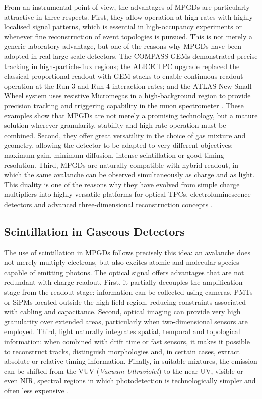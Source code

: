 \documentclass[12pt,a4paper]{article}
\begin{document}
From an instrumental point of view, the advantages of MPGDs are particularly attractive in three respects. First, they allow operation at high rates with highly localised signal patterns, which is essential in high-occupancy experiments or whenever fine reconstruction of event topologies is pursued. This is not merely a generic laboratory advantage, but one of the reasons why MPGDs have been adopted in real large-scale detectors. The COMPASS GEMs demonstrated precise tracking in high-particle-flux regions; the ALICE TPC upgrade replaced the classical proportional readout with GEM stacks to enable continuous-readout operation at the Run 3 and Run 4 interaction rates; and the ATLAS New Small Wheel system uses resistive Micromegas in a high-background region to provide precision tracking and triggering capability in the muon spectrometer \cite{ketzer2004compass,adolfsson2021alice,manthos2019atlas}. These examples show that MPGDs are not merely a promising technology, but a mature solution wherever granularity, stability and high-rate operation must be combined. Second, they offer great versatility in the choice of gas mixture and geometry, allowing the detector to be adapted to very different objectives: maximum gain, minimum diffusion, intense scintillation or good timing resolution. Third, MPGDs are naturally compatible with hybrid readout, in which the same avalanche can be observed simultaneously as charge and as light. This duality is one of the reasons why they have evolved from simple charge multipliers into highly versatile platforms for optical TPCs, electroluminescence detectors and advanced three-dimensional reconstruction concepts \cite{oliveira2012simulation,williams2024fatgems}.

\subsection{Scintillation in Gaseous Detectors}

The use of scintillation in MPGDs follows precisely this idea: an avalanche does not merely multiply electrons, but also excites atomic and molecular species capable of emitting photons. The optical signal offers advantages that are not redundant with charge readout. First, it partially decouples the amplification stage from the readout stage: information can be collected using cameras, PMTs or SiPMs located outside the high-field region, reducing constraints associated with cabling and capacitance. Second, optical imaging can provide very high granularity over extended areas, particularly when two-dimensional sensors are employed. Third, light naturally integrates spatial, temporal and topological information: when combined with drift time or fast sensors, it makes it possible to reconstruct tracks, distinguish morphologies and, in certain cases, extract absolute or relative timing information. Finally, in suitable mixtures, the emission can be shifted from the VUV (\textit{Vacuum Ultraviolet}) to the near UV, visible or even NIR, spectral regions in which photodetection is technologically simpler and often less expensive \cite{bondara2010direct,morozov2012secondary,oliveira2012simulation,santorelli2021spectroscopic,bondar2012study}.
\end{document}
